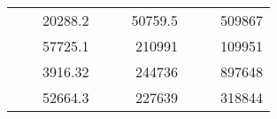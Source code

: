 \begin{table}[H]
\begin{tabular}{|ccrccrccc}
\rowcolor[HTML]{DDFDFF} 
\multicolumn{1}{|c|}{\cellcolor[HTML]{FFFFC7}}                                & \multicolumn{1}{c|}{\cellcolor[HTML]{DDFDFF}}                      & \multicolumn{1}{r|}{\cellcolor[HTML]{DAE8FC}20288.2}   & \multicolumn{1}{c|}{\cellcolor[HTML]{FFFFC7}}                                & \multicolumn{1}{c|}{\cellcolor[HTML]{DDFDFF}}                       & \multicolumn{1}{r|}{\cellcolor[HTML]{DDFDFF}50759.5}   & \multicolumn{1}{c|}{\cellcolor[HTML]{FFFFC7}}                                & \multicolumn{1}{c|}{\cellcolor[HTML]{DDFDFF}}                      & \multicolumn{1}{r|}{\cellcolor[HTML]{DDFDFF}509867}    \\ \cline{3-3} \cline{6-6} \cline{9-9} 
\multicolumn{1}{|c|}{\cellcolor[HTML]{FFFFC7}}                                & \multicolumn{1}{c|}{\cellcolor[HTML]{DDFDFF}}                      & \multicolumn{1}{r|}{\cellcolor[HTML]{DDFDFF}57725.1}   & \multicolumn{1}{c|}{\cellcolor[HTML]{FFFFC7}}                                & \multicolumn{1}{c|}{\cellcolor[HTML]{DDFDFF}}                       & \multicolumn{1}{r|}{\cellcolor[HTML]{DAE8FC}210991}    & \multicolumn{1}{c|}{\cellcolor[HTML]{FFFFC7}}                                & \multicolumn{1}{c|}{\cellcolor[HTML]{DDFDFF}}                      & \multicolumn{1}{r|}{\cellcolor[HTML]{DAE8FC}109951}    \\ \cline{3-3} \cline{6-6} \cline{9-9} 
\rowcolor[HTML]{DDFDFF} 
\multicolumn{1}{|c|}{\cellcolor[HTML]{FFFFC7}}                                & \multicolumn{1}{c|}{\cellcolor[HTML]{DDFDFF}}                      & \multicolumn{1}{r|}{\cellcolor[HTML]{DAE8FC}3916.32}   & \multicolumn{1}{c|}{\cellcolor[HTML]{FFFFC7}}                                & \multicolumn{1}{c|}{\cellcolor[HTML]{DDFDFF}}                       & \multicolumn{1}{r|}{\cellcolor[HTML]{DDFDFF}244736}    & \multicolumn{1}{c|}{\cellcolor[HTML]{FFFFC7}}                                & \multicolumn{1}{c|}{\cellcolor[HTML]{DDFDFF}}                      & \multicolumn{1}{r|}{\cellcolor[HTML]{DDFDFF}897648}    \\ \cline{3-3} \cline{6-6} \cline{9-9} 
\multicolumn{1}{|c|}{\cellcolor[HTML]{FFFFC7}}                                & \multicolumn{1}{c|}{\cellcolor[HTML]{DDFDFF}}                      & \multicolumn{1}{r|}{\cellcolor[HTML]{DDFDFF}52664.3}   & \multicolumn{1}{c|}{\cellcolor[HTML]{FFFFC7}}                                & \multicolumn{1}{c|}{\cellcolor[HTML]{DDFDFF}}                       & \multicolumn{1}{r|}{\cellcolor[HTML]{DAE8FC}227639}    & \multicolumn{1}{c|}{\cellcolor[HTML]{FFFFC7}}                                & \multicolumn{1}{c|}{\cellcolor[HTML]{DDFDFF}}                      & \multicolumn{1}{r|}{\cellcolor[HTML]{DAE8FC}318844}    \\ \cline{3-3} \cline{6-6} \cline{9-9} 

\end{tabular}
\end{table}
